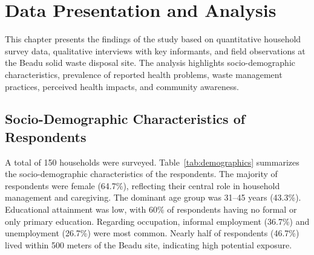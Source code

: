 
\chapter{Data Presentation and Analysis}
\label{chap:results}

This chapter presents the findings of the study based on quantitative household survey data, qualitative interviews with key informants, and field observations at the Beadu solid waste disposal site. The analysis highlights socio-demographic characteristics, prevalence of reported health problems, waste management practices, perceived health impacts, and community awareness.

\section{Socio-Demographic Characteristics of Respondents}

A total of 150 households were surveyed. Table~\ref{tab:demographics} summarizes the socio-demographic characteristics of the respondents. The majority of respondents were female (64.7\%), reflecting their central role in household management and caregiving. The dominant age group was 31--45 years (43.3\%). Educational attainment was low, with 60\% of respondents having no formal or only primary education. Regarding occupation, informal employment (36.7\%) and unemployment (26.7\%) were most common. Nearly half of respondents (46.7\%) lived within 500 meters of the Beadu site, indicating high potential exposure.

